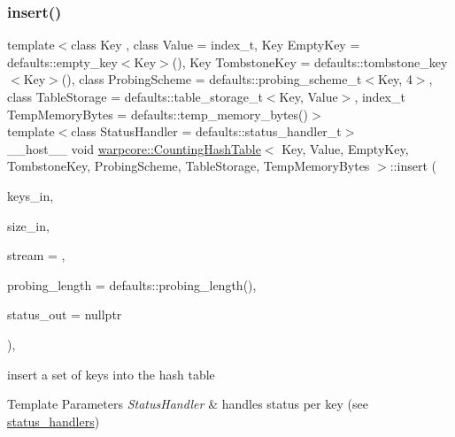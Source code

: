 \subsubsection{\texorpdfstring{insert()}{insert()}\hspace{0.1cm}{\footnotesize\ttfamily [2/2]}}
{\footnotesize\ttfamily template$<$class Key , class Value  = index\+\_\+t, Key Empty\+Key = defaults\+::empty\+\_\+key$<$\+Key$>$(), Key Tombstone\+Key = defaults\+::tombstone\+\_\+key$<$\+Key$>$(), class Probing\+Scheme  = defaults\+::probing\+\_\+scheme\+\_\+t$<$\+Key, 4$>$, class Table\+Storage  = defaults\+::table\+\_\+storage\+\_\+t$<$\+Key, Value$>$, index\+\_\+t Temp\+Memory\+Bytes = defaults\+::temp\+\_\+memory\+\_\+bytes()$>$ \\
template$<$class Status\+Handler  = defaults\+::status\+\_\+handler\+\_\+t$>$ \\
\+\_\+\+\_\+host\+\_\+\+\_\+ void \hyperlink{classwarpcore_1_1CountingHashTable}{warpcore\+::\+Counting\+Hash\+Table}$<$ Key, Value, Empty\+Key, Tombstone\+Key, Probing\+Scheme, Table\+Storage, Temp\+Memory\+Bytes $>$\+::insert (\begin{DoxyParamCaption}\item[{key\+\_\+type $\ast$}]{keys\+\_\+in,  }\item[{index\+\_\+type}]{size\+\_\+in,  }\item[{cuda\+Stream\+\_\+t}]{stream = {},  }\item[{index\+\_\+type}]{probing\+\_\+length = {\ttfamily defaults\+:\+:probing\+\_\+length()},  }\item[{typename Status\+Handler\+::base\+\_\+type $\ast$}]{status\+\_\+out = {\ttfamily nullptr} }\end{DoxyParamCaption})\hspace{0.3cm}{\ttfamily [inline]}, {\ttfamily [noexcept]}}



insert a set of keys into the hash table 


\begin{DoxyTemplParams}{Template Parameters}
{\em Status\+Handler} & handles status per key (see {\ttfamily \hyperlink{namespacewarpcore_1_1status__handlers}{status\+\_\+handlers}}) \\
\hline
\end{DoxyTemplParams}


